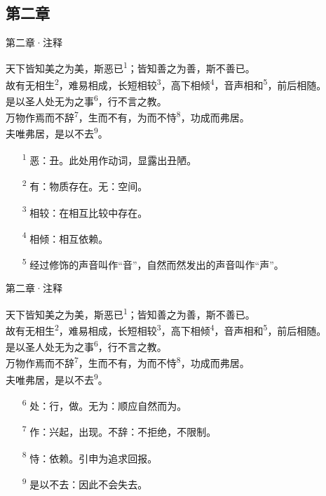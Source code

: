 \documentclass{beamer}
\newcommand{\classical}[1]{\textcolor{classical}{\kaishu #1}}         %
\newcommand{\notation}[1]{\textsuperscript{\textcolor{notemark}{\small #1}}} %
\newcommand{\originaltext}[1]{
	\begin{center}
		\large\classical{#1}
	\end{center}
	}
\begin{document}
\subsection{第二章}
\begin{frame}{第二章·注释}
	\originaltext{
	天下皆知美之为美，斯恶已\notation{1}；皆知善之为善，斯不善已。\\
	故有无相生\notation{2}，难易相成，长短相较\notation{3}，高下相倾\notation{4}，音声相和\notation{5}，前后相随。\\
	是以圣人处无为之事\notation{6}，行不言之教。\\
	万物作焉而不辞\notation{7}，生而不有，为而不恃\notation{8}，功成而弗居。\\夫唯弗居，是以不去\notation{9}。
	}
	\begin{itemize}
		\item[\notation{1}] 恶：丑。此处用作动词，显露出丑陋。
		\item[\notation{2}] 有：物质存在。无：空间。
		\item[\notation{3}] 相较：在相互比较中存在。
		\item[\notation{4}] 相倾：相互依赖。
		\item[\notation{5}] 经过修饰的声音叫作“音”，自然而然发出的声音叫作“声”。
	\end{itemize}
\end{frame}
\begin{frame}{第二章·注释}
	\originaltext{
	天下皆知美之为美，斯恶已\notation{1}；皆知善之为善，斯不善已。\\
	故有无相生\notation{2}，难易相成，长短相较\notation{3}，高下相倾\notation{4}，音声相和\notation{5}，前后相随。\\
	是以圣人处无为之事\notation{6}，行不言之教。\\
	万物作焉而不辞\notation{7}，生而不有，为而不恃\notation{8}，功成而弗居。\\夫唯弗居，是以不去\notation{9}。
	}
	\begin{itemize}
		\item[\notation{6}] 处：行，做。无为：顺应自然而为。
		\item[\notation{7}] 作：兴起，出现。不辞：不拒绝，不限制。
		\item[\notation{8}] 恃：依赖。引申为追求回报。
		\item[\notation{9}] 是以不去：因此不会失去。
	\end{itemize}
\end{frame}
\end{document}
